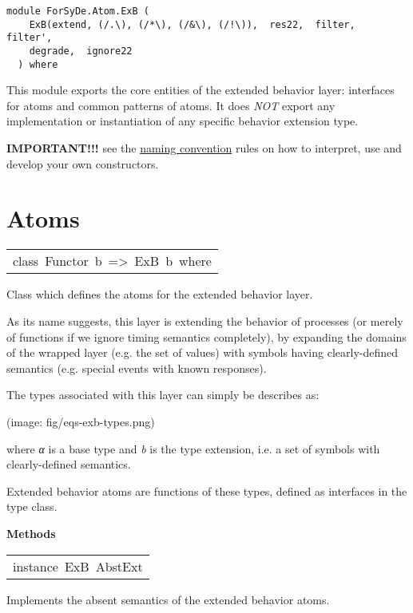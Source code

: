 \label{module:ForSyDe.Atom.ExB}
\haddockbeginheader
{\haddockverb\begin{verbatim}
module ForSyDe.Atom.ExB (
    ExB(extend, (/.\), (/*\), (/&\), (/!\)),  res22,  filter,  filter', 
    degrade,  ignore22
  ) where\end{verbatim}}
\haddockendheader

This module exports the core entities of the extended behavior
 layer: interfaces for atoms and common patterns of atoms. It does
 \emph{NOT} export any implementation or instantiation of any specific
 behavior extension type.\par
\textbf{IMPORTANT!!!}
 see the \href{ForSyDe-Atom.html#naming_conv}{naming convention} rules
 on how to interpret, use and develop your own constructors.\par

\section{Atoms}
\begin{haddockdesc}
\item[\begin{tabular}{@{}l}
class\ Functor\ b\ =>\ ExB\ b\ where
\end{tabular}]\haddockbegindoc
Class which defines the atoms for the extended behavior layer.\par
As its name suggests, this layer is extending the behavior of
 processes (or merely of functions if we ignore timing semantics
 completely), by expanding the domains of the wrapped layer
 (e.g. the set of values) with symbols having clearly-defined
 semantics (e.g. special events with known responses).\par
The types associated with this layer can simply be describes as:\par
(image: fig/eqs-exb-types.png)\par
where  \emph{α} is a base type and \emph{b} is the type extension,
 i.e. a set of symbols with clearly-defined semantics.\par
Extended behavior atoms are functions of these types, defined as
 interfaces in the  type class.\par

\haddockpremethods{}\textbf{Methods}
\end{haddockdesc}
\begin{haddockdesc}
\item[\begin{tabular}{@{}l}
instance\ ExB\ AbstExt
\end{tabular}]\haddockbegindoc
Implements the absent semantics of the extended behavior atoms.\par

\end{haddockdesc}
